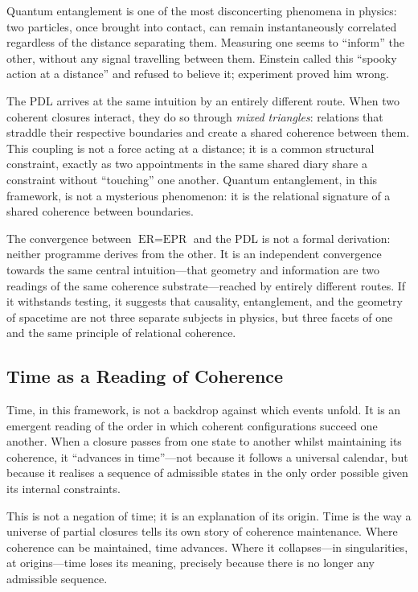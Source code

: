 \documentclass[12pt, a4paper, openright]{book}
\begin{document}
\medskip

Quantum entanglement is one of the most disconcerting phenomena in physics: two particles, once brought into contact, can remain instantaneously correlated regardless of the distance separating them. Measuring one seems to ``inform'' the other, without any signal travelling between them. Einstein called this ``spooky action at a distance'' and refused to believe it; experiment proved him wrong.

\medskip

The PDL arrives at the same intuition by an entirely different route. When two coherent closures interact, they do so through \emph{mixed triangles}: relations that straddle their respective boundaries and create a shared coherence between them. This coupling is not a force acting at a distance; it is a common structural constraint, exactly as two appointments in the same shared diary share a constraint without ``touching'' one another. Quantum entanglement, in this framework, is not a mysterious phenomenon: it is the relational signature of a shared coherence between boundaries.

\medskip

The convergence between $\text{ER} = \text{EPR}$ and the PDL is not a formal derivation: neither programme derives from the other. It is an independent convergence towards the same central intuition---that geometry and information are two readings of the same coherence substrate---reached by entirely different routes. If it withstands testing, it suggests that causality, entanglement, and the geometry of spacetime are not three separate subjects in physics, but three facets of one and the same principle of relational coherence.

\subsection*{Time as a Reading of Coherence}

Time, in this framework, is not a backdrop against which events unfold. It is an emergent reading of the order in which coherent configurations succeed one another. When a closure passes from one state to another whilst maintaining its coherence, it ``advances in time''---not because it follows a universal calendar, but because it realises a sequence of admissible states in the only order possible given its internal constraints.

\medskip

This is not a negation of time; it is an explanation of its origin. Time is the way a universe of partial closures tells its own story of coherence maintenance. Where coherence can be maintained, time advances. Where it collapses---in singularities, at origins---time loses its meaning, precisely because there is no longer any admissible sequence.
\end{document}
